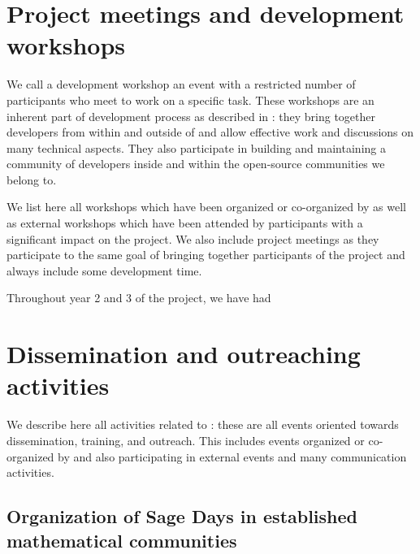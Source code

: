 \documentclass{deliverablereport}
\author{Viviane Pons et al.}
\begin{document}
\enlargethispage{4ex}
\maketitle
\githubissuedescription
\tableofcontents
\newpage


\section{Project meetings and development workshops}

We call a development workshop an event with a restricted number of participants
who meet to work on a specific task. These workshops are an inherent part
of \ODK development process as described in :
 they bring together
developers from within and outside of \ODK and allow effective work
and discussions on many technical aspects. They also participate in building
and maintaining a community of developers inside \ODK and within the
open-source communities we belong to.

We list here all workshops which have been organized or co-organized by \ODK
as well as external workshops which have been attended by \ODK participants
with a significant impact on the project. We also include project meetings as they
participate to the same goal of bringing together participants of the project and
always include some development time.

Throughout year 2 and 3 of the project, we have had




\section{Dissemination and outreaching activities}

We describe here all activities related to :
these are all events oriented towards dissemination, training, and outreach. This
includes events organized or co-organized by \ODK and also
participating in external events and many communication activities.

\subsection{Organization of Sage Days in established mathematical communities}
\end{document}
